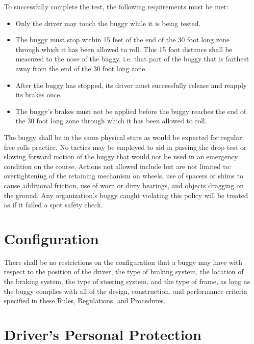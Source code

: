 To successfully complete the test, the following requirements must be met:
\begin{itemize}
	\item Only the driver may touch the buggy while it is being tested.
 
	\item The buggy must stop within 15 feet of the end of the 30 foot long zone through which it has been allowed to roll. This 15 foot distance shall be measured to the nose of the buggy, i.e. that part of the buggy that is farthest away from the end of the 30 foot long zone.
 
	\item After the buggy has stopped, its driver must successfully release and reapply its brakes once.
 
	\item The buggy's brakes must not be applied before the buggy reaches the end of the 30 foot long zone through which it has been allowed to roll.
\end{itemize}

The buggy shall be in the same physical state as would be expected for regular free rolls practice. No tactics may be employed to aid in passing the drop test or slowing forward motion of the buggy that would not be used in an emergency condition on the course. Actions not allowed include but are not limited to: overtightening of the retaining mechanism on wheels, use of spacers or shims to cause additional friction, use of worn or dirty bearings, and objects dragging on the ground. Any organization's buggy caught violating this policy will be treated as if it failed a spot safety check.


\section{Configuration}

	There shall be no restrictions on the configuration that a buggy may have with respect to the position of the driver, the type of braking system, the location of the braking system, the type of steering system, and the type of frame, as long as the buggy complies with all of the design, construction, and performance criteria specified in these Rules, Regulations, and Procedures.

\section{Driver's Personal Protection}

